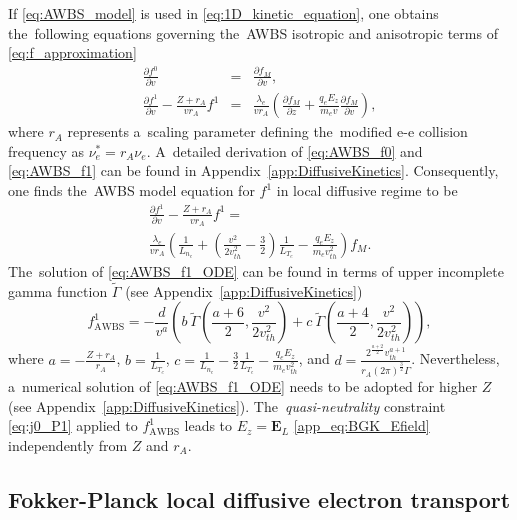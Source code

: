 \documentclass[
 aps,
 jmp,
 amsmath,amssymb,
 twocolumn,
]{revtex4-1}
\newcommand{\appref}[1]{Appendix~\ref{#1}}
\newcommand{\pdv}[2]{\frac{\partial{#1}}{\partial{#2}}}
\newcommand{\vect}[1]{\boldsymbol{#1}}
\newcommand{\mfpe}{\lambda_e}
\newcommand{\Zbar}{Z}
\newcommand{\nue}{\nu_{e}}
\newcommand{\vmag}{v}
\newcommand{\vth}{v_{th}}
\newcommand{\E}{\vect{E}}
\newcommand{\Ez}{E_z}
\newcommand{\qe}{q_e}
\newcommand{\me}{m_e}
\newcommand{\Te}{T_e}
\newcommand{\ed}{n_e}
\newcommand{\fM}{f_M}
\newcommand{\ft}{f}
\begin{document}
If \eqref{eq:AWBS_model} is used in \eqref{eq:1D_kinetic_equation}, one obtains
the~following equations governing the~AWBS isotropic and anisotropic terms of 
\eqref{eq:f_approximation}
\begin{eqnarray}
  \pdv{f^0}{\vmag} &=& \pdv{\fM}{\vmag} ,
  \label{eq:AWBS_f0} \\
  \pdv{f^1}{\vmag}  
  - \frac{\Zbar +  r_A}{\vmag r_A} f^1 &=& 
  \frac{\mfpe}{\vmag r_A}
  \left(\pdv{\fM}{z} + \frac{\qe\Ez}{\me\vmag}\pdv{\fM}{\vmag}\right) ,
  \label{eq:AWBS_f1} 
\end{eqnarray}
where $ r_A$ represents a~scaling parameter defining the~modified
e-e collision frequency as $\nue^* =  r_A \nue$.
A~detailed derivation of \eqref{eq:AWBS_f0} and \eqref{eq:AWBS_f1} 
can be found in Appendix~\ref{app:DiffusiveKinetics}.
Consequently, one finds the~AWBS model equation for $\ft^1$ 
in local diffusive regime to be
\begin{multline}
  \pdv{\ft^1}{\vmag} 
  - \frac{\Zbar +  r_A}{\vmag r_A}\ft^1
  = \\
  \frac{\mfpe}{\vmag r_A}\left(\frac{1}{L_{n_e}} + 
  \left( \frac{\vmag^2}{2 \vth^2} - \frac{3}{2}\right)
  \frac{1}{L_{T_e}} - \frac{\qe\Ez}{\me\vth^2}\right)\fM .
  \label{eq:AWBS_f1_ODE}
\end{multline}
The~solution of \eqref{eq:AWBS_f1_ODE} can be found in terms of 
upper incomplete gamma function $\tilde{\Gamma}$ 
(see \appref{app:DiffusiveKinetics})
\begin{equation}
  \ft^1_{\text{AWBS}} = - \frac{d}{\vmag^a} 
  \left(b~\tilde{\Gamma}{\left(\frac{a+6}{2}, \frac{\vmag^2}{2\vth^2}\right)}
  + c~\tilde{\Gamma}{\left(\frac{a+4}{2}, \frac{\vmag^2}{2\vth^2}\right)}\right)
  ,
  \label{eq:AWBS_analytic_solution}
\end{equation}
where 
$a = -\frac{\Zbar + r_A}{r_A}$, $b = \frac{1}{L_{\Te}}$, 
$c = \frac{1}{L_{\ed}} - \frac{3}{2}\frac{1}{L_{\Te}} 
- \frac{\qe\Ez}{\me\vth^2}$, and
$d = \frac{2^{\frac{a + 2}{2}} \vth^{a + 1}}{r_A (2\pi)^{\frac{3}{2}} \Gamma}$.
Nevertheless, a~numerical solution of \eqref{eq:AWBS_f1_ODE} needs to be 
adopted for higher $\Zbar$  (see \appref{app:DiffusiveKinetics}).
The~\textit{quasi-neutrality} constraint \eqref{eq:j0_P1} applied to
$\ft^1_{\text{AWBS}}$ leads to $\Ez = \E_L$ \eqref{app_eq:BGK_Efield} 
independently from $\Zbar$ and $r_A$. 

\subsection{Fokker-Planck local diffusive electron transport}
\label{sec:FPDiffusiveRegime}
\end{document}
